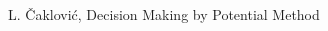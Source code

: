 \documentclass[letterpaper, 10 pt, conference]{ieeeconf}
\begin{document}
  \begin{thebibliography}{9} %
    
   L. \v{C}aklovi\'{c}, Decision Making by Potential Method

\end{thebibliography}
\end{document}
